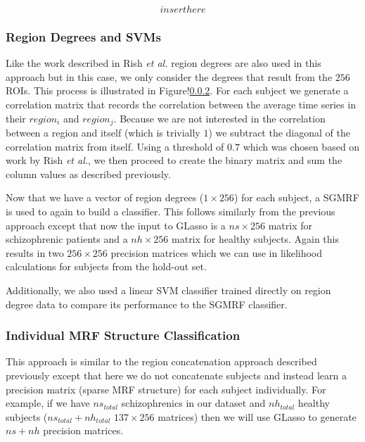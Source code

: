 \documentclass{article} %
\begin{document}
\begin{equation}
insert here
\end{equation}


\subsubsection{Region Degrees and SVMs}
Like the work described in Rish \emph{et al.} region degrees are also used in
this approach but in this case, we only consider the degrees that result from
the $256$ ROIs. This process is illustrated in Figure!\ref{}. For each subject 
we generate a correlation matrix that records the correlation between the 
average time series in their $region_i$ and $region_j$. Because we are not 
interested in the correlation between a region and itself (which is trivially 
$1$) we subtract the diagonal of the correlation matrix from itself. Using a
threshold of $0.7$ which was chosen based on work by Rish \emph{et al.}, we
then proceed to create the binary matrix and sum the column values as 
described previously.

Now that we have a vector of region degrees ($1 \times 256$) for each subject,
a SGMRF is used to again to build a classifier. This follows similarly from
the previous approach except that now the input to GLasso is a $ns \times 256$
matrix for schizophrenic patients and a $nh \times256$ matrix for healthy
subjects. Again this results in two $256 \times 256$ precision matrices which
we can use in likelihood calculations for subjects from the hold-out set.

Additionally, we also used a linear SVM classifier trained directly on
region degree data to compare its performance to the SGMRF classifier.

\subsubsection{Individual MRF Structure Classification}
This approach is similar to the region concatenation approach described 
previously except that here we do not concatenate subjects and instead
learn a precision matrix (sparse MRF structure) for each subject 
individually. For example, if we have $ns_{total}$ schizophrenics in our 
dataset and $nh_{total}$ healthy subjects ($ns_{total} + nh_{total}$ 
$137 \times 256$ matrices) then we will use GLasso to generate $ns + nh$ 
precision matrices.
\end{document}
